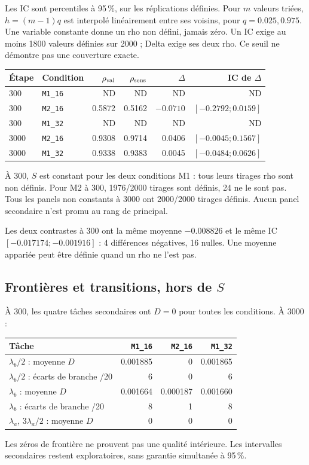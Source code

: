 \documentclass[11pt,a4paper]{article}
\newcommand{\Mone}{\texttt{M1\_16}}\newcommand{\Mtwo}{\texttt{M2\_16}}
\newcommand{\Mthree}{\texttt{M1\_32}}\newcommand{\That}{\widehat T_\theta}
\begin{document}
Les IC sont percentiles à 95\,\%, sur les réplications définies.
Pour $m$ valeurs triées, $h=(m-1)q$ est interpolé linéairement entre
ses voisins, pour $q=0.025,0.975$.
Une variable constante donne un rho non défini, jamais zéro.
Un IC exige au moins 1800 valeurs définies sur 2000 ;
Delta exige ses deux rho. Ce seuil ne démontre pas une couverture exacte.

\begin{center}\small
\begin{tabular}{llrrrr}
\toprule
Étape & Condition & $\rho_{\rm val}$ & $\rho_{\rm sens}$ & $\Delta$ & IC de $\Delta$\\
\midrule
300 & \Mone & ND & ND & ND & ND\\
300 & \Mtwo & 0.5872 & 0.5162 & $-0.0710$ & $[-0.2792;0.0159]$\\
300 & \Mthree & ND & ND & ND & ND\\
3000 & \Mtwo & 0.9308 & 0.9714 & 0.0406 & $[-0.0045;0.1567]$\\
3000 & \Mthree & 0.9338 & 0.9383 & 0.0045 & $[-0.0484;0.0626]$\\
\bottomrule
\end{tabular}
\end{center}
À 300, $S$ est constant pour les deux conditions M1 : tous leurs tirages
rho sont non définis. Pour M2 à 300, 1976/2000 tirages sont définis, 24 ne
le sont pas. Tous les panels non constants à 3000 ont 2000/2000 tirages
définis. Aucun panel secondaire n'est promu au rang de principal.

Les deux contrastes à 300 ont la même moyenne $-0.008826$ et le même IC
$[-0.017174;-0.001916]$ : 4 différences négatives, 16 nulles.
Une moyenne appariée peut être définie quand un rho ne l'est pas.

\subsection{Frontières et transitions, hors de \texorpdfstring{$S$}{S}}
À 300, les quatre tâches secondaires ont $D=0$ pour toutes les conditions.
À 3000 :
\begin{center}\small
\begin{tabular}{lrrr}
\toprule
Tâche & \Mone & \Mtwo & \Mthree\\
\midrule
$\lambda_b/2$ : moyenne $D$ & 0.001885 & 0 & 0.001865\\
$\lambda_b/2$ : écarts de branche /20 & 6 & 0 & 6\\
$\lambda_b$ : moyenne $D$ & 0.001664 & 0.000187 & 0.001660\\
$\lambda_b$ : écarts de branche /20 & 8 & 1 & 8\\
$\lambda_a$, $3\lambda_a/2$ : moyenne $D$ & 0 & 0 & 0\\
\bottomrule
\end{tabular}
\end{center}
Les zéros de frontière ne prouvent pas une qualité intérieure.
Les intervalles secondaires restent exploratoires, sans garantie
simultanée à 95\,\%.
\end{document}
